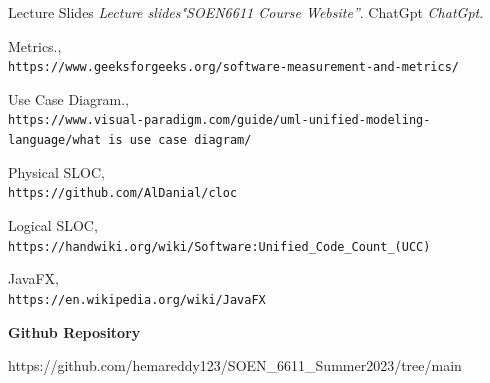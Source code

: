 \documentclass[12pt,letterpaper]{report}
\begin{document}

\begin{thebibliography}{7}

    
    Lecture Slides 
    \textit{Lecture slides"SOEN6611 Course Website”}.     
    ChatGpt
    \textit{ChatGpt}.     
    
    Metrics.,
    \\\texttt{https://www.geeksforgeeks.org/software-measurement-and-metrics/}
    
    Use Case Diagram.,
    \\\texttt{https://www.visual-paradigm.com/guide/uml-unified-modeling-language/what is use case diagram/}

 
    Physical SLOC,
    \\\texttt{https://github.com/AlDanial/cloc}


    Logical SLOC,
    \\\texttt{https://handwiki.org/wiki/Software:Unified\_Code\_Count\_(UCC)}

    JavaFX,
    \\\texttt{https://en.wikipedia.org/wiki/JavaFX}



    
\end{thebibliography}

 
\textbf{{Github Repository}}

https://github.com/hemareddy123/SOEN\_6611\_Summer2023/tree/main
\end{document}
